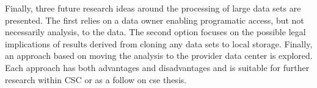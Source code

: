 Finally, three future research ideas around the processing of large data sets are presented. The first relies on a data owner enabling programatic access, but not necessarily analysis, to the data.  The second option focuses on the possible legal implications of results derived from cloning any data sets to local storage. Finally, an approach based on moving the analysis to the provider data center is explored. Each approach has both advantages and disadvantages and is suitable for further research within \textsc{CSC} or as a follow on \gls{cse} thesis.